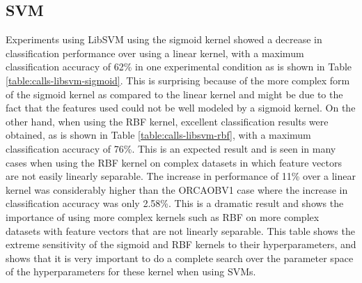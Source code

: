 %
%
\subsection{SVM}

Experiments using LibSVM using the sigmoid kernel showed a decrease in
classification performance over using a linear kernel, with a maximum
classification accuracy of 62\% in one experimental condition as is
shown in Table \ref{table:calls-libsvm-sigmoid}.  This is surprising
because of the more complex form of the sigmoid kernel as compared to
the linear kernel and might be due to the fact that the features used
could not be well modeled by a sigmoid kernel.  On the other hand,
when using the RBF kernel, excellent classification results were
obtained, as is shown in Table \ref{table:calls-libsvm-rbf}, with a
maximum classification accuracy of 76\%.  This is an expected result
and is seen in many cases when using the RBF kernel on complex
datasets in which feature vectors are not easily linearly separable.
The increase in performance of 11\% over a linear kernel was
considerably higher than the ORCAOBV1 case where the increase in
classification accuracy was only 2.58\%.  This is a dramatic result
and shows the importance of using more complex kernels such as RBF on
more complex datasets with feature vectors that are not linearly
separable.  This table shows the extreme sensitivity of the sigmoid
and RBF kernels to their hyperparameters, and shows that it is very
important to do a complete search over the parameter space of the
hyperparameters for these kernel when using SVMs.

